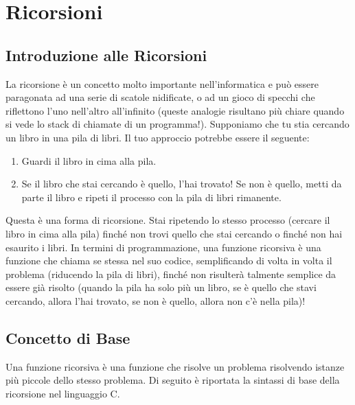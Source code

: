 \section{Ricorsioni}
\label{ch:ricorsioni}

\subsection{Introduzione alle Ricorsioni}

La ricorsione è un concetto molto importante nell'informatica e può essere paragonata ad 
una serie di scatole nidificate, o ad un gioco di specchi che riflettono l'uno nell'altro 
all'infinito (queste analogie risultano più chiare quando si vede lo stack di chiamate di 
un programma!). Supponiamo che tu stia cercando un libro in una pila di libri. 
Il tuo approccio potrebbe 
essere il seguente:
\begin{enumerate}
	\item Guardi il libro in cima alla pila. 
	\item Se il libro che stai cercando è quello, l'hai trovato! Se non è quello, metti da 
		parte il libro e ripeti il processo con la pila di libri rimanente. 
\end{enumerate}
Questa è una forma di ricorsione. 
Stai ripetendo lo stesso processo (cercare il libro in cima alla pila) finché non 
trovi quello che stai cercando o finché non hai esaurito i libri. 
In termini di programmazione, una funzione ricorsiva è una funzione che chiama se 
stessa nel suo codice, semplificando di volta in volta il problema (riducendo 
la pila di libri), finché non risulterà talmente semplice da essere già risolto 
(quando la pila ha solo più un libro, se è quello che stavi cercando, allora l'hai trovato, 
se non è quello, allora non c'è nella pila)!

\subsection{Concetto di Base}
Una funzione ricorsiva è una funzione che risolve un problema risolvendo istanze 
più piccole dello stesso problema. Di seguito è riportata la sintassi di base della 
ricorsione nel linguaggio C.

